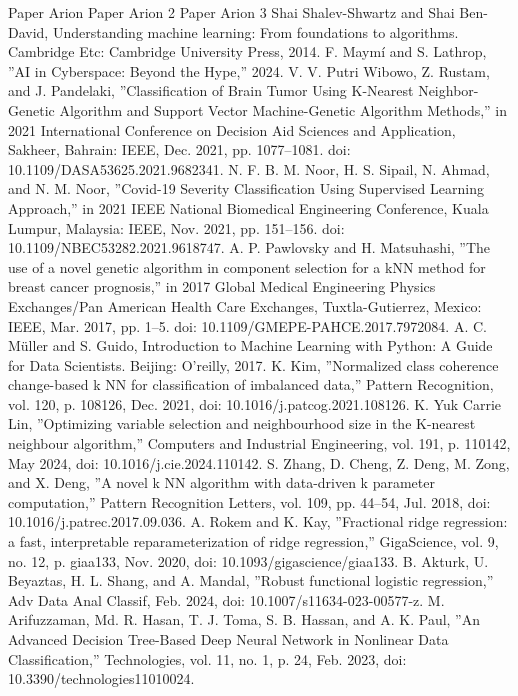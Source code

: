 \documentclass[conference]{IEEEtran}
\begin{document}
\begin{thebibliography}{00}
 Paper Arion
 Paper Arion 2
 Paper Arion 3
 Shai Shalev-Shwartz and Shai Ben-David, Understanding machine learning: From foundations to algorithms. Cambridge Etc: Cambridge University Press, 2014.
 F. Maymí and S. Lathrop, ''AI in Cyberspace: Beyond the Hype,'' 2024.
 V. V. Putri Wibowo, Z. Rustam, and J. Pandelaki, ''Classification of Brain Tumor Using K-Nearest Neighbor-Genetic Algorithm and Support Vector Machine-Genetic Algorithm Methods,'' in 2021 International Conference on Decision Aid Sciences and Application, Sakheer, Bahrain: IEEE, Dec. 2021, pp. 1077--1081. doi: 10.1109/DASA53625.2021.9682341.
 N. F. B. M. Noor, H. S. Sipail, N. Ahmad, and N. M. Noor, ''Covid-19 Severity Classification Using Supervised Learning Approach,'' in 2021 IEEE National Biomedical Engineering Conference, Kuala Lumpur, Malaysia: IEEE, Nov. 2021, pp. 151--156. doi: 10.1109/NBEC53282.2021.9618747.
 A. P. Pawlovsky and H. Matsuhashi, ''The use of a novel genetic algorithm in component selection for a kNN method for breast cancer prognosis,'' in 2017 Global Medical Engineering Physics Exchanges/Pan American Health Care Exchanges, Tuxtla-Gutierrez, Mexico: IEEE, Mar. 2017, pp. 1--5. doi: 10.1109/GMEPE-PAHCE.2017.7972084.
 A. C. Müller and S. Guido, Introduction to Machine Learning with Python: A Guide for Data Scientists. Beijing: O'reilly, 2017.
 K. Kim, ''Normalized class coherence change-based k NN for classification of imbalanced data,'' Pattern Recognition, vol. 120, p. 108126, Dec. 2021, doi: 10.1016/j.patcog.2021.108126.
 K. Yuk Carrie Lin, ''Optimizing variable selection and neighbourhood size in the K-nearest neighbour algorithm,'' Computers and Industrial Engineering, vol. 191, p. 110142, May 2024, doi: 10.1016/j.cie.2024.110142.
 S. Zhang, D. Cheng, Z. Deng, M. Zong, and X. Deng, ''A novel k NN algorithm with data-driven k parameter computation,'' Pattern Recognition Letters, vol. 109, pp. 44--54, Jul. 2018, doi: 10.1016/j.patrec.2017.09.036.
 A. Rokem and K. Kay, ''Fractional ridge regression: a fast, interpretable reparameterization of ridge regression,'' GigaScience, vol. 9, no. 12, p. giaa133, Nov. 2020, doi: 10.1093/gigascience/giaa133.
 B. Akturk, U. Beyaztas, H. L. Shang, and A. Mandal, ''Robust functional logistic regression,'' Adv Data Anal Classif, Feb. 2024, doi: 10.1007/s11634-023-00577-z.
 M. Arifuzzaman, Md. R. Hasan, T. J. Toma, S. B. Hassan, and A. K. Paul, ''An Advanced Decision Tree-Based Deep Neural Network in Nonlinear Data Classification,'' Technologies, vol. 11, no. 1, p. 24, Feb. 2023, doi: 10.3390/technologies11010024.

\end{thebibliography}
\end{document}
